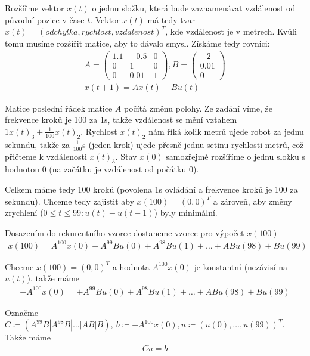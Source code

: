 \documentclass[12pt, a4paper]{article}
\begin{document}
\section{}
Rozšířme vektor $x(t)$ o jednu složku, která bude zaznamenávat vzdálenost od původní pozice v čase $t$. Vektor $x(t)$ má tedy tvar $x(t)=(odchylka, rychlost, vzdalenost)^T$, kde vzdálenost je v metrech. Kvůli tomu musíme rozšířit matice, aby to dávalo smysl. Získáme tedy rovnici:
\begin{gather*}
A = \begin{pmatrix}
1.1 & -0.5 & 0\\
0 & 1 & 0\\
0 & 0.01 & 1
\end{pmatrix},
B = \begin{pmatrix}
-2\\
0.01\\
0
\end{pmatrix}\\
x(t+1)= Ax(t) + Bu(t)
\end{gather*}

Matice poslední řádek matice $A$ počítá změnu polohy. Ze zadání víme, že frekvence kroků je 100 za 1s, takže vzdálenost se mění vztahem $1x(t)_3 + \frac{1}{100}x(t)_2$. Rychlost $x(t)_2$ nám říká kolik metrů ujede robot za jednu sekundu, takže za $\frac{1}{100}$s (jeden krok) ujede přesně jednu setinu rychlosti metrů, což přičteme k vzdálenosti $x(t)_3$. Stav $x(0)$ samozřejmě rozšíříme o jednu složku s hodnotou 0 (na začátku je vzdálenost od počátku 0).

Celkem máme tedy 100 kroků (povolena 1s ovládání a frekvence kroků je 100 za sekundu). Chceme tedy zajistit aby $x(100)=(0,0)^T$ a zároveň, aby změny zrychlení ($0 \leq t \leq 99: u(t)-u(t-1)$) byly minimální.

Dosazením do rekurentního vzorce dostaneme vzorec pro výpočet $x(100)$
\begin{gather*}
x(100)=A^{100} x(0) + A^{99}Bu(0) + A^{98}Bu(1) + \dots + ABu(98) + Bu(99) 
\end{gather*}

Chceme $x(100)=(0,0)^T$ a hodnota $A^{100}x(0)$ je konstantní (nezávisí na $u(t)$), takže máme
\begin{gather*}
-A^{100} x(0) = + A^{99}Bu(0) + A^{98}Bu(1) + \dots + ABu(98) + Bu(99) 
\end{gather*}

Označme $C \coloneqq (A^{99}B|A^98B|\dots|AB|B),\ b \coloneqq -A^{100}x(0), u \coloneqq (u(0), \dots, u(99))^T$. Takže máme
\begin{gather*}
Cu=b
\end{gather*}
\end{document}
